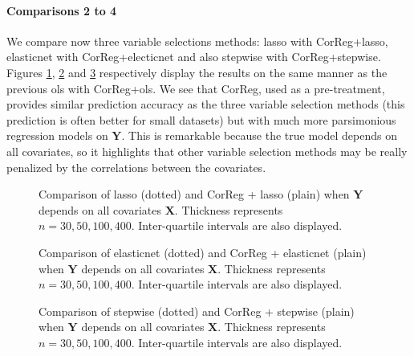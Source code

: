 \documentclass[11pt,a4paper]{article}
\begin{document}
\paragraph{Comparisons 2 to 4} We compare now three variable selections methods: {\sc lasso} with {\sc CorReg}+{\sc lasso}, elasticnet with {\sc CorReg}+electicnet and also stepwise with {\sc CorReg}+stepwise. Figures \ref{toutlar}, \ref{toutelast} and \ref{toutstepwise} respectively display the results on the same manner as the previous {\sc ols} with {\sc CorReg}+{\sc ols}. We see that {\sc CorReg}, used as a pre-treatment, provides similar prediction accuracy as the three variable selection methods (this prediction is often better for small datasets) but with much more parsimonious regression models on $\boldsymbol{Y}$. This is remarkable because the true model depends on all covariates, so it highlights that other variable selection methods may be really penalized by the correlations between the covariates.

\begin{figure}[h!]
	 \quad
	\caption{Comparison of {\sc lasso} (dotted) and {\sc CorReg} + {\sc lasso} (plain) when $\boldsymbol{Y}$ depends on all covariates ${\boldsymbol{X}}$. Thickness represents $n=30,50,100,400$.  Inter-quartile intervals are also displayed.}\label{toutlar}
\end{figure}

\begin{figure}[h!]
	 \quad
	\caption{Comparison of elasticnet (dotted) and {\sc CorReg} + elasticnet (plain)  when $\boldsymbol{Y}$ depends on all covariates ${\boldsymbol{X}}$. Thickness represents $n=30,50,100,400$.  Inter-quartile intervals are also displayed.}\label{toutelast}
\end{figure}


\begin{figure}[h!]
	 \quad
	\caption{Comparison of stepwise (dotted) and {\sc CorReg} + stepwise (plain)  when $\boldsymbol{Y}$ depends on all covariates ${\boldsymbol{X}}$. Thickness represents $n=30,50,100,400$.  Inter-quartile intervals are also displayed.}\label{toutstepwise}
\end{figure}
\end{document}
